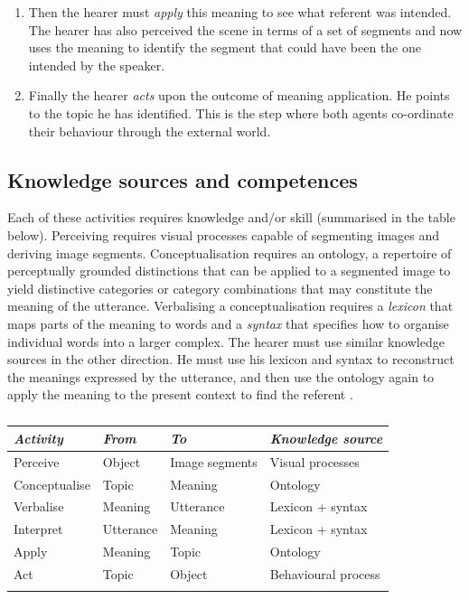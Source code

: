 \begin{enumerate}
\item Then the hearer must {\itshape apply} this meaning
to see what referent was intended. The hearer has
also perceived the scene in terms of a set of 
segments and now uses 
the meaning to identify the segment that
could have been the one intended by the speaker.

\item Finally the hearer {\itshape acts} upon the outcome of meaning
application. He points to the topic he has identified. This is the 
step where both agents co-ordinate their 
behaviour through the external world. 
\end{enumerate}

\subsection{Knowledge sources and competences}

Each of these activities requires knowledge and/or skill
(summarised in the table below). Perceiving requires 
visual processes capable of segmenting images and deriving image 
segments. Conceptualisation requires an ontology, 
a repertoire of perceptually grounded distinctions
that can be applied to a segmented image to yield 
distinctive categories or category combinations that 
may constitute the meaning of the utterance. Verbalising 
a conceptualisation requires 
a {\itshape lexicon} that maps parts of the meaning to words and 
a {\itshape syntax} that specifies how to organise individual words
into a larger complex. 
The hearer must use similar 
knowledge sources in the other direction. He must use 
his lexicon and syntax to reconstruct the meanings expressed
by the utterance, and then use the 
ontology again to apply the meaning to the present 
context to find the referent . 


\begin{table}[htbp]
\caption{}
\label{tab:2:findthereferent}
\begin{tabular}{ l  l  l  l }
\lsptoprule
{\itshape Activity} & {\itshape From} & {\itshape To} & {\itshape Knowledge source}\\ \midrule
Perceive & Object & Image segments & Visual processes \\ 
Conceptualise & Topic & Meaning & Ontology  \\ 
Verbalise & Meaning & Utterance & Lexicon + syntax \\  
Interpret & Utterance & Meaning & Lexicon + syntax \\ 
Apply & Meaning & Topic & Ontology \\ 
Act & Topic & Object & Behavioural process  \\ 
\lspbottomrule
\end{tabular}
\end{table}

